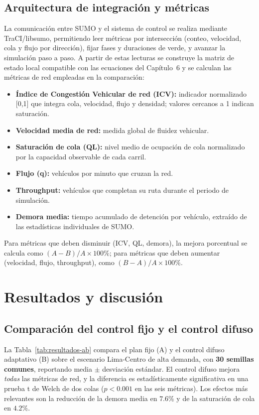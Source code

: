 \subsection{Arquitectura de integración y métricas}\label{sec:integracion-metricas}

La comunicación entre SUMO y el sistema de control se realiza mediante TraCI/libsumo,
permitiendo leer métricas por intersección (conteo, velocidad, cola y flujo por dirección),
fijar fases y duraciones de verde, y avanzar la simulación paso a paso. A partir de estas
lecturas se construye la matriz de estado local compatible con las ecuaciones del
Capítulo~6 y se calculan las métricas de red empleadas en la comparación:

\begin{itemize}
  \item \textbf{Índice de Congestión Vehicular de red (ICV):} indicador normalizado [0,1] que
  integra cola, velocidad, flujo y densidad; valores cercanos a 1 indican saturación.
  \item \textbf{Velocidad media de red:} medida global de fluidez vehicular.
  \item \textbf{Saturación de cola (QL):} nivel medio de ocupación de cola normalizado por la
  capacidad observable de cada carril.
  \item \textbf{Flujo (q):} vehículos por minuto que cruzan la red.
  \item \textbf{Throughput:} vehículos que completan su ruta durante el periodo de simulación.
  \item \textbf{Demora media:} tiempo acumulado de detención por vehículo, extraído de las
  estadísticas individuales de SUMO.
\end{itemize}

Para métricas que deben disminuir (ICV, QL, demora), la mejora porcentual se calcula como
$(A-B)/A\times100\%$; para métricas que deben aumentar (velocidad, flujo, throughput), como
$(B-A)/A\times100\%$.

\section{Resultados y discusión}\label{sec:resultados-discusion}

\subsection{Comparación del control fijo y el control difuso}

La Tabla~\ref{tab:resultados-ab} compara el plan fijo (A) y el control difuso adaptativo (B) sobre el
escenario Lima-Centro de alta demanda, con \textbf{30 semillas comunes}, reportando media $\pm$ desviación
estándar. El control difuso mejora \emph{todas} las métricas de red, y la diferencia es estadísticamente
significativa en una prueba t de Welch de dos colas ($p<0.001$ en las seis métricas). Los efectos más
relevantes son la reducción de la demora media en $7.6\%$ y de la saturación de cola en $4.2\%$.

